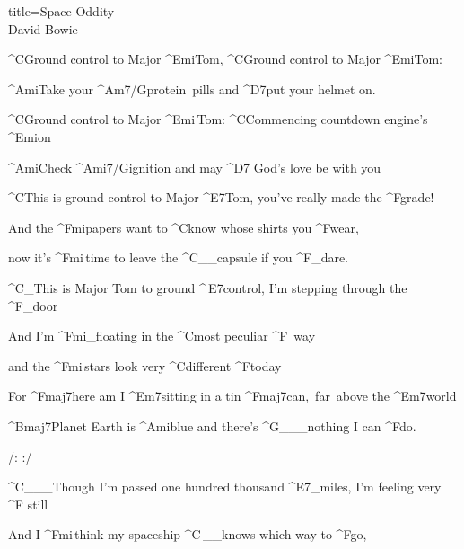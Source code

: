 \begin{song}{title=\predtitle\centering Space Oddity \\\large David Bowie  \vspace*{-0.3cm}}  %

\nejvetsi
\begin{centerjustified}

\sloka 
	^{C\z}Ground control to Major ^{Emi\z}Tom, ^{C\z}Ground control to Major ^{Emi\z}Tom:

	^{Ami}Take your ^{Am7/G\z}protein~pills and ^{D7}put your helmet on.

	^{C\z}Ground control to Major ^{Emi\,}Tom:  ^{C\z}Commencing countdown engine's ^{Emi\z}on~~

	^{Ami\z}Check ^{Ami7/G}ignition and may ^{D7\,\,}God's love be with you

	^{C\z }This is ground control to Major ^{E7}Tom, you've really made the ^{F\z}grade!

	And the ^{Fmi\z }papers want to ^{C\z }know whose shirts you ^{F\z}wear,

	now it's ^{Fmi\,}time to leave the ^{C{\color{white}\_\_}}capsule if you ^{F{\color{white}\_}}dare.

	^{C{\color{white}\_}}This is Major Tom to ground ^{\,E7}control, I'm stepping through the ^{F{\color{white}\_}}door

	And I'm ^{Fmi{\color{white}\_}}floating in the ^{C\z}most peculiar ^{F\,\,\,}way 

	and the ^{Fmi\,}stars look very ^{C\z}different ^{F}today

	For ^{Fmaj7}here am I ^{Em7}sitting in a tin ^{Fmaj7\:}can,~far~above the ^{Em7}world

	^{Bmaj7}Planet Earth is ^{Ami}blue and there's ^{G{\color{white}\_\_\_}}nothing I can ^{F}do.

	\phantom{.}

	\phantom{.}

/:  :/ 

\end{centerjustified}
\newpage
\begin{centerjustified}

\sloka
	^{C{\color{white}\_\_\_}}Though I'm passed one hundred thousand ^{E7{\color{white}\_}}miles, I'm feeling very ^{F\,\,}still

	And I ^{Fmi\,}think my spaceship ^{C\,{\color{white}\_\_}}knows which way to ^{F}go,


\end{centerjustified}
\end{song}
